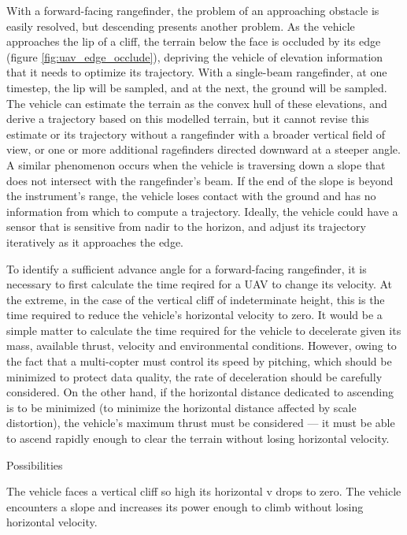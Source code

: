 \documentclass[10pt,a4paper]{report}
\begin{document}
With a forward-facing rangefinder, the problem of an approaching obstacle is easily resolved, but descending presents another problem. As the vehicle approaches the lip of a cliff, the terrain below the face is occluded by its edge (figure \ref{fig:uav_edge_occlude}), depriving the vehicle of elevation information that it needs to optimize its trajectory. With a single-beam rangefinder, at one timestep, the lip will be sampled, and at the next, the ground will be sampled. The vehicle can estimate the terrain as the convex hull of these elevations, and derive a trajectory based on this modelled terrain, but it cannot revise this estimate or its trajectory without a rangefinder with a broader vertical field of view, or one or more additional ragefinders directed downward at a steeper angle. A similar phenomenon occurs when the vehicle is traversing down a slope that does not intersect with the rangefinder's beam. If the end of the slope is beyond the instrument's range, the vehicle loses contact with the ground and has no information from which to compute a trajectory.  Ideally, the vehicle could have a sensor that is sensitive from nadir to the horizon, and adjust its trajectory iteratively as it approaches the edge. 

To identify a sufficient advance angle for a forward-facing rangefinder, it is necessary to first calculate the time reqired for a UAV to change its velocity. At the extreme, in the case of the vertical cliff of indeterminate height, this is the time required to reduce the vehicle's horizontal velocity to zero. It would be a simple matter to calculate the time required for the vehicle to decelerate given its mass, available thrust, velocity and environmental conditions. However, owing to the fact that a multi-copter must control its speed by pitching, which should be minimized to protect data quality, the rate of deceleration should be carefully considered. On the other hand, if the horizontal distance dedicated to ascending is to be minimized (to minimize the horizontal distance affected by scale distortion), the vehicle's maximum thrust must be considered --- it must be able to ascend rapidly enough to clear the terrain without losing horizontal velocity.

Possibilities

The vehicle faces a vertical cliff so high its horizontal v drops to zero.
The vehicle encounters a slope and increases its power enough to climb without losing horizontal velocity.
\end{document}
